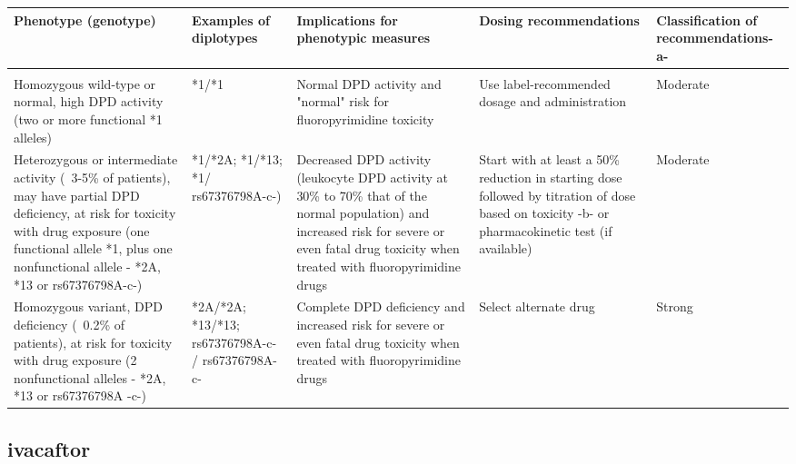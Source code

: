 \documentclass{report}
\begin{document}
      \begin{tabularx}{\textwidth}{ XXXXX }
      \textbf{ Phenotype (genotype) }&\textbf{ Examples of diplotypes }&\textbf{ Implications for phenotypic measures }&\textbf{ Dosing recommendations }&\textbf{ Classification of recommendations-a- } \\ \hline \\  Homozygous wild-type or normal, high DPD activity (two or more functional *1 alleles) & *1/*1 & Normal DPD activity and "normal" risk for fluoropyrimidine toxicity & Use label-recommended dosage and administration & Moderate  \\  Heterozygous or intermediate activity (~3-5\% of patients), may have partial DPD deficiency, at risk for toxicity with drug exposure (one functional allele *1, plus one nonfunctional allele - *2A, *13 or rs67376798A-c-) & *1/*2A; *1/*13; *1/ rs67376798A-c-) & Decreased DPD activity (leukocyte DPD activity at 30\% to 70\% that of the normal population) and increased risk for severe or even fatal drug toxicity when treated with fluoropyrimidine drugs & Start with at least a 50\% reduction in starting dose followed by titration of dose based on toxicity -b- or pharmacokinetic test (if available) & Moderate  \\  Homozygous variant, DPD deficiency (~0.2\% of patients), at risk for toxicity with drug exposure (2 nonfunctional alleles - *2A, *13 or rs67376798A -c-) & *2A/*2A; *13/*13; rs67376798A-c- / rs67376798A-c- & Complete DPD deficiency and increased risk for severe or even fatal drug toxicity when treated with fluoropyrimidine drugs & Select alternate drug & Strong  \\ 
      \end{tabularx}
      
      \normalsize


\subsection{ ivacaftor }
\end{document}
